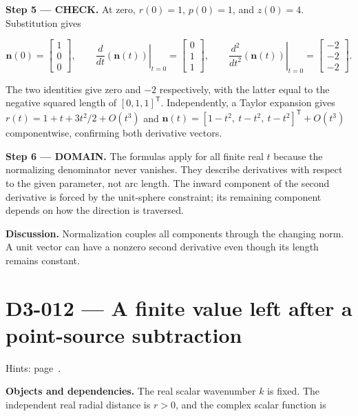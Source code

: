 \documentclass[11pt,oneside,openany]{book}
\begin{document}
\endgroup
\textbf{Step 5 --- CHECK.} At zero, \(r(0)=1\), \(p(0)=1\), and \(z(0)=4\). Substitution gives

\[
\mathbf n(0)=\begin{bmatrix}1\\0\\0\end{bmatrix},\qquad
\left.\frac{d}{dt}\left(\mathbf n(t)\right)\right|_{t=0}
=\begin{bmatrix}0\\1\\1\end{bmatrix},\qquad
\left.\frac{d^2}{dt^2}\left(\mathbf n(t)\right)\right|_{t=0}
=\begin{bmatrix}-2\\-2\\-2\end{bmatrix}.
\]

The two identities give zero and \(-2\) respectively, with the latter equal to the negative squared length of \([0,1,1]^{\mathsf T}\). Independently, a Taylor expansion gives \(r(t)=1+t+3t^2/2+O(t^3)\) and
\(\mathbf n(t)=[1-t^2,\ t-t^2,\ t-t^2]^{\mathsf T}+O(t^3)\) componentwise, confirming both derivative vectors.

\begin{DomainStep}
\textbf{Step 6 --- DOMAIN.} The formulas apply for all finite real \(t\) because the normalizing denominator never vanishes. They describe derivatives with respect to the given parameter, not arc length. The inward component of the second derivative is forced by the unit-sphere constraint; its remaining component depends on how the direction is traversed.

\end{DomainStep}
\textbf{Discussion.} Normalization couples all components through the changing norm. A unit vector can have a nonzero second derivative even though its length remains constant.
\clearpage
\section{D3-012 --- A finite value left after a point-source subtraction}
\label{problem:D3-012}
{\small Hints: page~\pageref{hints:D3-012}.}\par\medskip

\textbf{Objects and dependencies.} The real scalar wavenumber \(k\) is fixed. The independent real radial distance is \(r>0\), and the complex scalar function is
\end{document}
